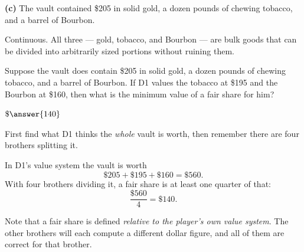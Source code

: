 \documentclass[12pt]{ximera}
\begin{document}
\begin{problem}
\begin{prompt}
\textbf{(c)} The vault contained \$205 in solid gold, a dozen pounds of chewing
tobacco, and a barrel of Bourbon.

\begin{multipleChoice}
\end{multipleChoice}

\begin{feedback}
Continuous. All three --- gold, tobacco, and Bourbon --- are bulk goods that can be
divided into arbitrarily sized portions without ruining them.
\end{feedback}
\end{prompt}
\end{problem}

\begin{problem}
Suppose the vault does contain \$205 in solid gold, a dozen pounds of chewing tobacco,
and a barrel of Bourbon. If D1 values the tobacco at \$195 and the Bourbon at \$160,
then what is the minimum value of a fair share for him?

$\$\answer{140}$

\begin{hint}
First find what D1 thinks the \emph{whole} vault is worth, then remember there are
four brothers splitting it.
\end{hint}

\begin{feedback}
In D1's value system the vault is worth
\[ \$205 + \$195 + \$160 = \$560. \]
With four brothers dividing it, a fair share is at least one quarter of that:
\[ \frac{\$560}{4} = \$140. \]

Note that a fair share is defined \emph{relative to the player's own value system}.
The other brothers will each compute a different dollar figure, and all of them are
correct for that brother.
\end{feedback}
\end{problem}
\end{document}
